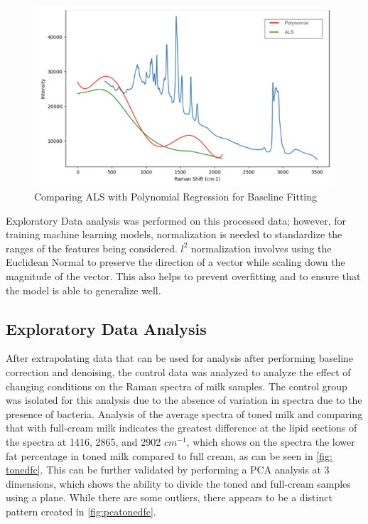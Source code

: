 \begin{figure}
    \centering
    \includegraphics[width=0.5\linewidth]{Figures/ALSvPoly.png}
    \caption{Comparing ALS with Polynomial Regression for Baseline Fitting}
    \label{fig:baseline-fit}
\end{figure}

\noindent Exploratory Data analysis was performed on this processed data; however, for training machine learning models, normalization is needed to standardize the ranges of the features being considered. $l^2$ normalization involves using the Euclidean Normal to preserve the direction of a vector while scaling down the magnitude of the vector. \cite{Celebi2010_EuclideanNormApprox} This also helps to prevent overfitting and to ensure that the model is able to generalize well. 

\subsection{Exploratory Data Analysis}

After extrapolating data that can be used for analysis after performing baseline correction and denoising, the control data was analyzed to analyze the effect of changing conditions on the Raman spectra of milk samples. The control group was isolated for this analysis due to the absence of variation in spectra due to the presence of bacteria. Analysis of the average spectra of toned milk and comparing that with full-cream milk indicates the greatest difference at the lipid sections of the spectra at 1416, 2865, and 2902 $cm^{-1}$, which shows on the spectra the lower fat percentage in toned milk compared to full cream, as can be seen in \autoref{fig: tonedfc}. This can be further validated by performing a PCA analysis at 3 dimensions, which shows the ability to divide the toned and full-cream samples using a plane. While there are some outliers, there appears to be a distinct pattern created in \autoref{fig:pcatonedfc}. \\


